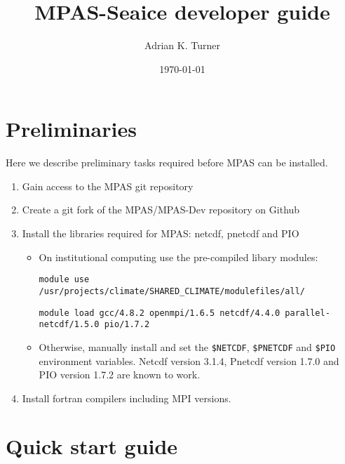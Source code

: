 \documentclass{article}
\begin{document}
\title{MPAS-Seaice developer guide}
\author{Adrian K. Turner} 
\date{\today}
\maketitle


\section{Preliminaries}
\label{sec:preliminaries}

Here we describe preliminary tasks required before MPAS can be installed.

\begin{enumerate}

\item Gain access to the MPAS git repository

\item Create a git fork of the MPAS/MPAS-Dev repository on Github

\item Install the libraries required for MPAS: netcdf, pnetcdf and PIO

\begin{itemize}

\item On institutional computing use the pre-compiled libary modules:

\verb+module use /usr/projects/climate/SHARED_CLIMATE/modulefiles/all/+

\verb+module load gcc/4.8.2 openmpi/1.6.5 netcdf/4.4.0 parallel-netcdf/1.5.0 pio/1.7.2+

\item Otherwise, manually install and set the \verb+$NETCDF+, \verb+$PNETCDF+ and \verb+$PIO+ environment variables. Netcdf version 3.1.4, Pnetcdf version 1.7.0 and PIO version 1.7.2 are known to work.

\end{itemize}

\item Install fortran compilers including MPI versions.

\end{enumerate}


\section{Quick start guide}
\label{sec:quick_start_guide}
\end{document}
